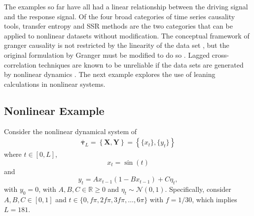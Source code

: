 \documentclass[a4paper,11pt,twocolumn]{article}
\begin{document}
The examples so far have all had a linear relationship between the driving signal and the response signal.  Of the four broad categories of time series causality tools, transfer entropy \cite{} and SSR methods \cite{} are the two categories that can be applied to nonlinear datasets without modification.  The conceptual framework of granger causality is not restricted by the linearity of the data set \cite{}, but the original formulation by Granger must be modified to do so \cite{}.  Lagged cross-correlation techniques are known to be unreliable if the data sets are generated by nonlinear dynamics \cite{Rogosa,??}.  The next example explores the use of leaning calculations in nonlinear systems.

\subsection{Nonlinear Example}
\label{sec:nonli}
Consider the nonlinear dynamical system of
\begin{eqnarray}
\label{eqn:nonlinearEX}
\bar{\mathbf{\tau}}_L = \left\{\mathbf{X},\mathbf{Y}\right\} = \left\{\{x_t\},\{y_t\}\right\}
\end{eqnarray}
where $t\in[0,L]$,
\begin{equation*}
x_t = \sin(t)
\end{equation*}
and
\begin{equation*}
y_t = Ax_{t-1}\left(1-Bx_{t-1}\right)+C\eta_t,
\end{equation*}
with $y_0 = 0$, with $A,B,C\in\mathbb{R}\ge 0$ and $\eta_t\sim\mathcal{N}\left(0,1\right)$.  Specifically, consider $A,B,C\in[0,1]$ and $t\in\{0,f\pi,2f\pi,3f\pi,\ldots,6\pi\}$ with $f=1/30$, which implies $L=181$.
\end{document}
